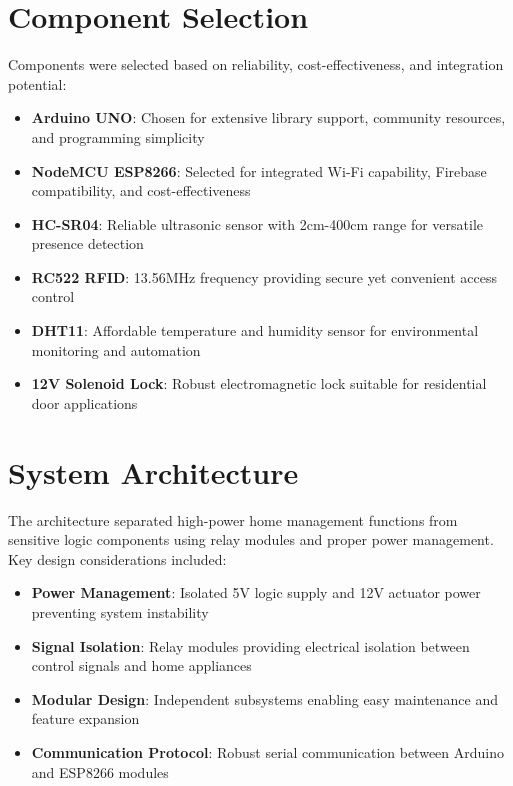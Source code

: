 \documentclass[12pt,a4paper]{report}
\begin{document}
\section{Component Selection}

\noindent Components were selected based on reliability, cost-effectiveness, and integration potential:

\begin{itemize}
\item \textbf{Arduino UNO}: Chosen for extensive library support, community resources, and programming simplicity
\item \textbf{NodeMCU ESP8266}: Selected for integrated Wi-Fi capability, Firebase compatibility, and cost-effectiveness
\item \textbf{HC-SR04}: Reliable ultrasonic sensor with 2cm-400cm range for versatile presence detection
\item \textbf{RC522 RFID}: 13.56MHz frequency providing secure yet convenient access control
\item \textbf{DHT11}: Affordable temperature and humidity sensor for environmental monitoring and automation
\item \textbf{12V Solenoid Lock}: Robust electromagnetic lock suitable for residential door applications
\end{itemize}

\section{System Architecture}

\noindent The architecture separated high-power home management functions from sensitive logic components using relay modules and proper power management. Key design considerations included:

\begin{itemize}
\item \textbf{Power Management}: Isolated 5V logic supply and 12V actuator power preventing system instability
\item \textbf{Signal Isolation}: Relay modules providing electrical isolation between control signals and home appliances
\item \textbf{Modular Design}: Independent subsystems enabling easy maintenance and feature expansion
\item \textbf{Communication Protocol}: Robust serial communication between Arduino and ESP8266 modules
\end{itemize}
\end{document}
